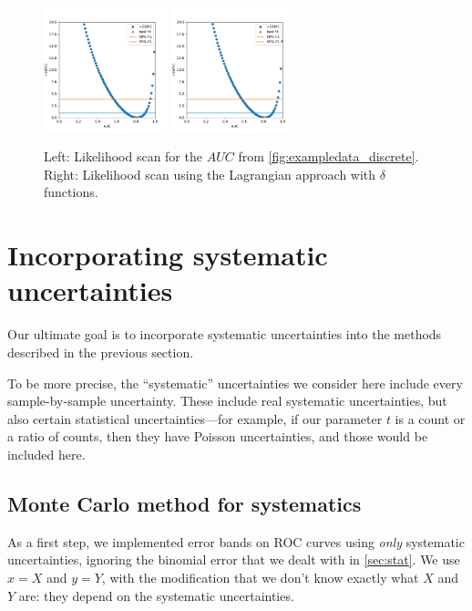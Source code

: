 \documentclass[11pt]{article}
\newcommand{\AUC}{AUC}
\begin{document}
\begin{figure}
\begin{center}
\includegraphics[width=0.32\textwidth]{discrete_scan.pdf}
\includegraphics[width=0.32\textwidth]{delta_functions_scan_compare_to_discrete.pdf}
\caption{Left: Likelihood scan for the \(\AUC\) from \cref{fig:exampledata_discrete}.  Right: Likelihood scan using the Lagrangian approach with \(\delta\) functions.\label{fig:exampledata_delta_functions_disagreement}}
\end{center}
\end{figure}

\section{Incorporating systematic uncertainties}

Our ultimate goal is to incorporate systematic uncertainties into the methods described in the previous section.

To be more precise, the ``systematic'' uncertainties we consider here include every sample-by-sample uncertainty.  These include real systematic uncertainties, but also certain statistical uncertainties---for example, if our parameter \(t\) is a count or a ratio of counts, then they have Poisson uncertainties, and those would be included here.

\subsection{Monte Carlo method for systematics}

As a first step, we implemented error bands on ROC curves using \emph{only} systematic uncertainties, ignoring the binomial error that we dealt with in \cref{sec:stat}.  We use \(x=X\) and \(y=Y\), with the modification that we don't know exactly what \(X\) and \(Y\) are: they depend on the systematic uncertainties.
\end{document}
